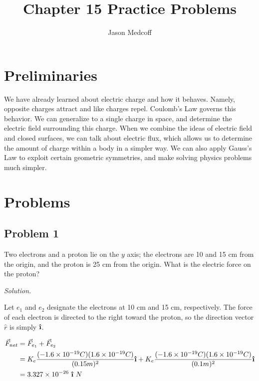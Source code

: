 \documentclass{article}
\title{Chapter 15 Practice Problems}
\author{Jason Medcoff}
\date{}
\newcommand{\uveci}{{\boldsymbol{\hat{\textnormal{\bfseries\i}}}}}
\begin{document}
	
	\maketitle
	
	\section{Preliminaries}
	
	We have already learned about electric charge and how it behaves. Namely, opposite charges attract and like charges repel. Coulomb's Law governs this behavior. We can generalize to a single charge in space, and determine the electric field surrounding this charge.
	When we combine the ideas of electric field and closed surfaces, we can talk about electric flux, which allows us to determine the amount of charge within a body in a simpler way. We can also apply Gauss's Law to exploit certain geometric symmetries, and make solving physics problems much simpler.
	
	\section{Problems}
	
	\subsection{Problem 1}
	
	Two electrons and a proton lie on the $y$ axis; the electrons are 10 and 15 cm from the origin, and the proton is 25 cm from the origin. What is the electric force on the proton?
	
    \textit{Solution.}
    
    Let $e_1$ and $e_2$ designate the electrons at 10 cm and 15 cm, respectively. The force of each electron is directed to the right toward the proton, so the direction vector $\hat{r}$ is simply $\uveci$.
    
    \begin{equation*}
    \begin{split}
    \vec{F}_{net} & = \vec{F}_{e_1} + \vec{F}_{e_2} \\
                  & = K_e \frac{(-1.6 \times 10^{-19} C)(1.6 \times 10^{-19} C)}{(0.15 m)^2} \uveci + K_e \frac{(-1.6 \times 10^{-19} C)(1.6 \times 10^{-19} C)}{(0.1 m)^2} \uveci \\
                  & = 3.327 \times 10^{-26} \ \uveci \ N \\
    \end{split}
    \end{equation*}
    
\end{document}
